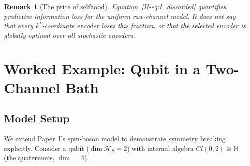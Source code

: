 \documentclass[12pt,a4paper,openany]{book}
\newtheorem{remark}[theorem]{Remark}
\begin{document}
\begin{remark}[The price of selfhood]
\label{II-rem:price}
Equation~\eqref{II-eq:I_discarded} quantifies predictive information loss
for the uniform raw-channel model.  It does not say that every
$k^*$-coordinate encoder loses this fraction, or that the selected
encoder is globally optimal over all stochastic encoders.
\end{remark}

\section{Worked Example: Qubit in a Two-Channel Bath}
\label{II-sec:example}

\subsection{Model Setup}
\label{II-subsec:model}

We extend Paper~I's spin-boson model to demonstrate
symmetry breaking explicitly.
Consider a qubit ($\dim \mathcal{H}_S = 2$) with internal
algebra $Cl(0,2) \cong \mathbb{H}$ (the quaternions,
$\dim = 4$).
\end{document}

